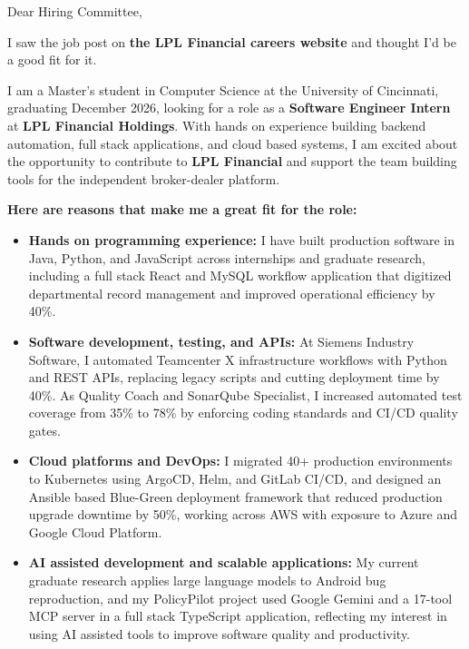 \documentclass[11pt]{letter}
\date{}
\begin{document}
\begin{letter}{}

\opening{Dear Hiring Committee,}

I saw the job post on \textbf{the LPL Financial careers website} and thought I'd be a good fit for it.

I am a Master's student in Computer Science at the University of Cincinnati, graduating December 2026, looking for a role as a \textbf{Software Engineer Intern} at \textbf{LPL Financial Holdings}. With hands on experience building backend automation, full stack applications, and cloud based systems, I am excited about the opportunity to contribute to \textbf{LPL Financial} and support the team building tools for the independent broker-dealer platform.

\textbf{Here are reasons that make me a great fit for the role:}

\begin{itemize}[leftmargin=*, itemsep=0.45em]
    \item \textbf{Hands on programming experience:} I have built production software in Java, Python, and JavaScript across internships and graduate research, including a full stack React and MySQL workflow application that digitized departmental record management and improved operational efficiency by 40\%.

    \item \textbf{Software development, testing, and APIs:} At Siemens Industry Software, I automated Teamcenter X infrastructure workflows with Python and REST APIs, replacing legacy scripts and cutting deployment time by 40\%. As Quality Coach and SonarQube Specialist, I increased automated test coverage from 35\% to 78\% by enforcing coding standards and CI/CD quality gates.

    \item \textbf{Cloud platforms and DevOps:} I migrated 40+ production environments to Kubernetes using ArgoCD, Helm, and GitLab CI/CD, and designed an Ansible based Blue-Green deployment framework that reduced production upgrade downtime by 50\%, working across AWS with exposure to Azure and Google Cloud Platform.

    \item \textbf{AI assisted development and scalable applications:} My current graduate research applies large language models to Android bug reproduction, and my PolicyPilot project used Google Gemini and a 17-tool MCP server in a full stack TypeScript application, reflecting my interest in using AI assisted tools to improve software quality and productivity.
\end{itemize}


\end{letter}
\end{document}
